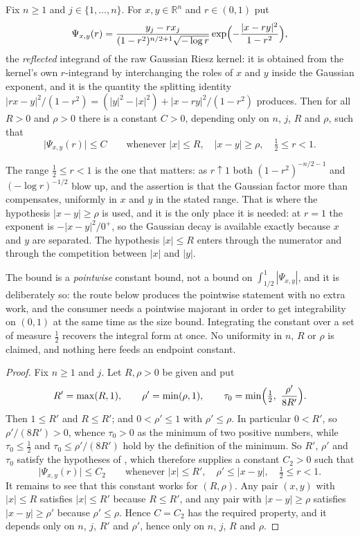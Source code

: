 \begin{lemma}[A constant bound for the reflected kernel integrand near $r = 1$]
Fix $n \geq 1$ and $j \in \{1,\ldots,n\}$.  For $x,y \in \mathbb{R}^n$ and $r \in (0,1)$ put
\[
  \Psi_{x,y}(r)
    = \frac{y_j - r x_j}{(1-r^2)^{n/2+1}\sqrt{-\log r}}
      \exp\Bigl(-\frac{|x-ry|^2}{1-r^2}\Bigr) ,
\]
the \emph{reflected} integrand of the raw Gaussian Riesz kernel: it is obtained from the
kernel's own $r$-integrand by interchanging the roles of $x$ and $y$ inside the Gaussian
exponent, and it is the quantity the splitting identity
$|rx-y|^2/(1-r^2) = (|y|^2-|x|^2) + |x-ry|^2/(1-r^2)$ produces.  Then for all $R > 0$ and
$\rho > 0$ there is a constant $C > 0$, depending only on $n$, $j$, $R$ and $\rho$, such
that
\[
  \bigl|\Psi_{x,y}(r)\bigr| \leq C
  \qquad\text{whenever } |x| \leq R,\quad |x-y| \geq \rho,\quad \tfrac12 \leq r < 1 .
\]

The range $\tfrac12 \leq r < 1$ is the one that matters: as $r \uparrow 1$ both
$(1-r^2)^{-n/2-1}$ and $(-\log r)^{-1/2}$ blow up, and the assertion is that the Gaussian
factor more than compensates, uniformly in $x$ and $y$ in the stated range.  That is where
the hypothesis $|x-y| \geq \rho$ is used, and it is the only place it is needed: at $r = 1$
the exponent is $-|x-y|^2/0^+$, so the Gaussian decay is available exactly because $x$ and
$y$ are separated.  The hypothesis $|x| \leq R$ enters through the numerator and through
the competition between $|x|$ and $|y|$.

The bound is a \emph{pointwise} constant bound, not a bound on
$\int_{1/2}^1|\Psi_{x,y}|$, and it is deliberately so: the route below produces the
pointwise statement with no extra work, and the consumer needs a pointwise majorant in
order to get integrability on $(0,1)$ at the same time as the size bound.  Integrating the
constant over a set of measure $\tfrac12$ recovers the integral form at once.  No
uniformity in $n$, $R$ or $\rho$ is claimed, and nothing here feeds an endpoint constant.
\end{lemma}
\begin{proof}
Fix $n \geq 1$ and $j$.  Let $R,\rho > 0$ be given and put
\[
  R' = \max(R,1) , \qquad \rho' = \min(\rho,1) , \qquad
  \tau_0 = \min\Bigl(\tfrac12,\ \frac{\rho'}{8R'}\Bigr) .
\]
Then $1 \leq R'$ and $R \leq R'$; and $0 < \rho' \leq 1$ with $\rho' \leq \rho$.  In
particular $0 < R'$, so $\rho'/(8R') > 0$, whence $\tau_0 > 0$ as the minimum of two
positive numbers, while $\tau_0 \leq \tfrac12$ and $\tau_0 \leq \rho'/(8R')$ hold by the
definition of the minimum.  So $R'$, $\rho'$ and $\tau_0$ satisfy the hypotheses of
, which therefore supplies a constant
$C_2 > 0$ such that
\[
  \bigl|\Psi_{x,y}(r)\bigr| \leq C_2
  \qquad\text{whenever } |x| \leq R',\quad \rho' \leq |x-y|,\quad \tfrac12 \leq r < 1 .
\]
It remains to see that this constant works for $(R,\rho)$.  Any pair $(x,y)$ with
$|x| \leq R$ satisfies $|x| \leq R'$ because $R \leq R'$, and any pair with
$|x-y| \geq \rho$ satisfies $|x-y| \geq \rho'$ because $\rho' \leq \rho$.  Hence
$C = C_2$ has the required property, and it depends only on $n$, $j$, $R'$ and $\rho'$,
hence only on $n$, $j$, $R$ and $\rho$.
\end{proof}
